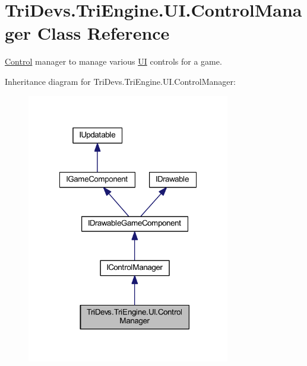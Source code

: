 \hypertarget{class_tri_devs_1_1_tri_engine_1_1_u_i_1_1_control_manager}{\section{Tri\-Devs.\-Tri\-Engine.\-U\-I.\-Control\-Manager Class Reference}
\label{class_tri_devs_1_1_tri_engine_1_1_u_i_1_1_control_manager}
}


\hyperlink{class_tri_devs_1_1_tri_engine_1_1_u_i_1_1_control}{Control} manager to manage various \hyperlink{namespace_tri_devs_1_1_tri_engine_1_1_u_i}{U\-I} controls for a game.  




Inheritance diagram for Tri\-Devs.\-Tri\-Engine.\-U\-I.\-Control\-Manager\-:
\nopagebreak
\begin{figure}[H]
\begin{center}
\leavevmode
\includegraphics[width=251pt]{class_tri_devs_1_1_tri_engine_1_1_u_i_1_1_control_manager__inherit__graph}
\end{center}
\end{figure}


